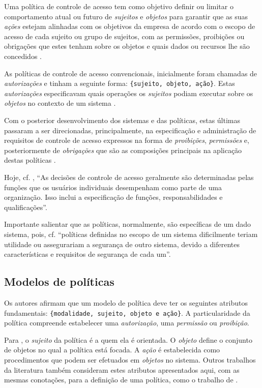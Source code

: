 Uma política de controle de acesso tem como objetivo definir ou limitar o comportamento atual ou futuro de \textit{sujeitos} e \textit{objetos} para garantir que as suas \textit{ações} estejam alinhadas com os objetivos da empresa de acordo com o escopo de acesso de cada sujeito ou grupo de sujeitos, com as permissões, proibições ou obrigações que estes tenham sobre os objetos e quais dados ou recursos lhe são concedidos \cite{dunlop_dynamic_2002}.%

As políticas de controle de acesso convencionais, inicialmente foram chamadas de \textit{autorizações} e tinham a seguinte forma: \verb|{sujeito, objeto, ação}|. Estas \textit{autorizações} especificavam quais operações os \textit{sujeitos} podiam executar sobre os \textit{objetos} no contexto de um sistema \cite{di_vimercati_policies_2005}. %

Com o posterior desenvolvimento dos sistemas e das políticas, estas últimas passaram a ser direcionadas, principalmente, na especificação e administração de requisitos de controle de acesso expressos na forma de \textit{proibições}, \textit{permissões }e, posteriormente de \textit{obrigações} que são as composições principais na aplicação destas políticas \cite{sarkar_2017}.

Hoje, cf. , ``As decisões de controle de acesso geralmente são determinadas pelas funções que os usuários individuais desempenham como parte de uma organização. Isso inclui a especificação de funções, responsabilidades e qualificações''.

Importante salientar que as políticas, normalmente, são específicas de um dado sistema, pois, cf.  ``políticas definidas no escopo de um sistema dificilmente teriam utilidade ou assegurariam a segurança de outro sistema, devido a diferentes características e requisitos de segurança de cada um''.

\subsection{Modelos de políticas}\label{modelo_politicas}
Os autores  afirmam que um modelo de política deve ter os seguintes atributos fundamentais: \verb|{modalidade, sujeito, objeto e ação}|. A particularidade da política compreende estabelecer uma \textit{autorização}, uma \textit{permissão} ou \textit{proibição}. 

Para , o \textit{sujeito }da política é a quem ela é orientada. O \textit{objeto} define o conjunto de objetos no qual a política está focada. A \textit{ação} é estabelecida como procedimentos que podem ser efetuados em \textit{objetos} no sistema. Outros trabalhos da literatura também consideram estes atributos apresentados aqui, com as mesmas conotações, para a definição de uma política, como o trabalho de  .

